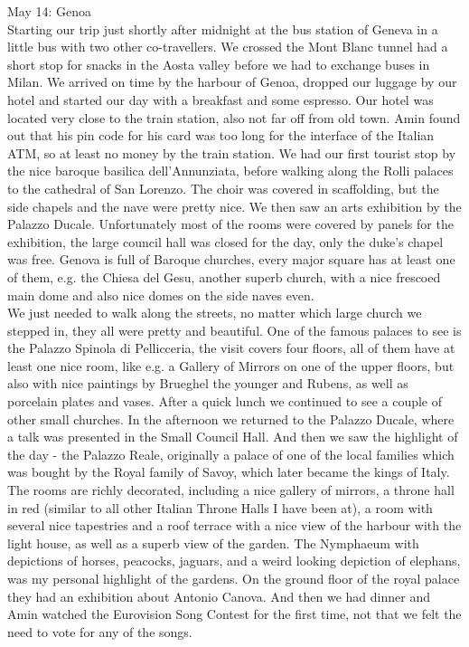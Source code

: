 May 14: Genoa\\
Starting our trip just shortly after midnight at the bus station of Geneva in a little bus with two other co-travellers. We crossed the Mont Blanc tunnel had a short stop for snacks in the Aosta valley before we had to exchange buses in Milan. We arrived on time by the harbour of Genoa, dropped our luggage by our hotel and started our day with a breakfast and some espresso. Our hotel was located very close to the train station, also not far off from old town. Amin found out that his pin code for his card was too long for the interface of the Italian ATM, so at least no money by the train station. We had our first tourist stop by the nice baroque basilica dell'Annunziata, before walking along the Rolli palaces to the cathedral of San Lorenzo. The choir was covered in scaffolding, but the side chapels and the nave were pretty nice. We then saw an arts exhibition by the Palazzo Ducale. Unfortunately most of the rooms were covered by panels for the exhibition, the large council hall was closed for the day, only the duke's chapel was free. Genova is full of Baroque churches, every major square has at least one of them, e.g. the Chiesa del Gesu, another superb church, with a nice frescoed main dome and also nice domes on the side naves even. \\
We just needed to walk along the streets, no matter which large church we stepped in, they all were pretty and beautiful. One of the famous palaces to see is the Palazzo Spinola di Pellicceria, the visit covers four floors, all of them have at least one nice room, like e.g. a Gallery of Mirrors on one of the upper floors, but also with nice paintings by Brueghel the younger and Rubens, as well as porcelain plates and vases. After a quick lunch we continued to see a couple of other small churches. In the afternoon we returned to the Palazzo Ducale, where a talk was presented in the Small Council Hall. And then we saw the highlight of the day - the Palazzo Reale, originally a palace of one of the local families which was bought by the Royal family of Savoy, which later became the kings of Italy. The rooms are richly decorated, including a nice gallery of mirrors, a throne hall in red (similar to all other Italian Throne Halls I have been at), a room with several nice tapestries and a roof terrace with a nice view of the harbour with the light house, as well as a superb view of the garden. The Nymphaeum with depictions of horses, peacocks, jaguars, and a weird looking depiction of elephans, was my personal highlight of the gardens. On the ground floor of the royal palace they had an exhibition about Antonio Canova. And then we had dinner and Amin watched the Eurovision Song Contest for the first time, not that we felt the need to vote for any of the songs.\\

